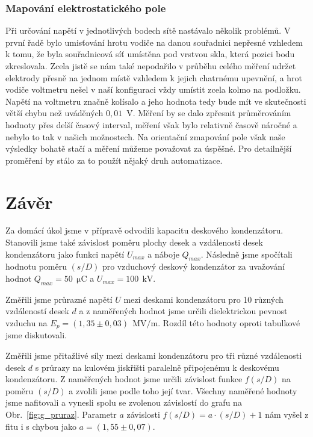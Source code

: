 \documentclass[english]{article}
\newcommand{\unit}[1]{\ \mathrm{#1}}
\begin{document}
			\subsubsection{Mapování elektrostatického pole}
					Při určování napětí v jednotlivých bodech sítě nastávalo několik problémů. V první řadě bylo umisťování hrotu vodiče na danou souřadnici nepřesné vzhledem k tomu, že byla souřadnicová síť umístěna pod vrstvou skla, která pozici bodu zkreslovala. Zcela jistě se nám také nepodařilo v průběhu celého měření udržet elektrody přesně na jednom místě vzhledem k jejich chatrnému upevnění, a hrot vodiče voltmetru nešel v naší konfiguraci vždy umístit zcela kolmo na podložku. Napětí na voltmetru značně kolísalo a jeho hodnota tedy bude mít ve skutečnosti větší chybu než uváděných $0,01$~V. Měření by se dalo zpřesnit průměrováním hodnoty přes delší časový interval, měření však bylo relativně časově náročné a nebylo to tak v našich možnostech. Na orientační zmapování pole však naše výsledky bohatě stačí a měření můžeme považovat za úspěšné. Pro detailnější proměření by stálo za to použít nějaký druh automatizace.
	
\section{Závěr}
		Za domácí úkol jsme v přípravě odvodili kapacitu deskového kondenzátoru. Stanovili jsme také závislost poměru plochy desek a vzdálenosti desek kondenzátoru jako funkci napětí $U_{max}$ a náboje $Q_{max}$. Následně jsme spočítali hodnotu poměru $(s/D)$ pro vzduchový deskový kondenzátor za uvažování hodnot $Q_{max}=50~\unit{\mu C}$ a $U_{max}=100~\unit{kV}$. 
		
		Změřili jsme průrazné napětí $U$ mezi deskami kondenzátoru pro 10 různých vzdáleností desek $d$ a z naměřených hodnot jsme určili dielektrickou pevnost vzduchu na $E_p = (1,35\pm 0,03)~\unit{MV/m}$. Rozdíl této hodnoty oproti tabulkové \cite{bib:tabulky} jsme diskutovali. 
		
		Změřili jsme přitažlivé síly mezi deskami kondenzátoru pro tři různé vzdálenosti desek $d$ s průrazy na kulovém jiskřišti paralelně připojenému k deskovému kondenzátoru. Z naměřených hodnot jsme určili závislost funkce $f(s/D)$ na poměru $(s/D)$ a zvolili jsme podle toho její tvar. Všechny naměřené hodnoty jsme nafitovali a vynesli spolu se zvolenou závislostí do grafu na Obr.~\ref{fig:g_pruraz}. Parametr $a$ závislosti $f(s/D) = a\cdot(s/D)+1$ nám vyšel z fitu i s chybou jako $a = (1,55\pm0,07)$.
		
\end{document}
